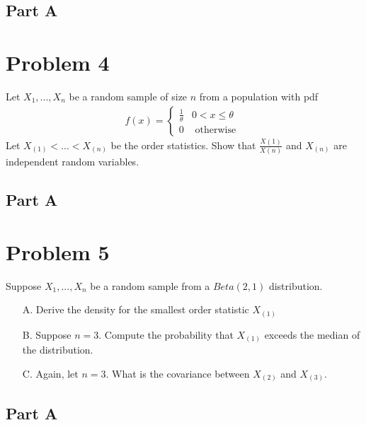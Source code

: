 \documentclass{article}
\begin{document}
\subsection*{Part A}
   
\clearpage
\section*{Problem 4}
 Let $X_1,...,X_n$ be a random sample of size $n$ from a population with pdf
 \begin{align*}
 f(x) = \begin{cases} 
      \frac{1}{\theta} & 0<x\leq \theta \\
       0 & \text{ otherwise } 
   \end{cases}
\end{align*}
Let $X_{(1)}<...< X_{(n)}$ be the order statistics. Show that $\frac{X(1)}{X(n)}$ and $X_{(n)}$ are independent
random variables.

\subsection*{Part A}



\clearpage
\section*{Problem 5}
Suppose $X_1,...,X_n$ be a random sample from a $Beta(2,1)$ distribution.
\begin{enumerate}
\item[A.] Derive the density for the smallest order statistic $X_{(1)}$
\item[B.] Suppose $n = 3$. Compute the probability that $X_{(1)}$ exceeds the median of the distribution.
\item[C.] Again, let $n = 3$. What is the covariance between $X_{(2)}$ and $X_{(3)}$.

\end{enumerate}

\subsection*{Part A}
\end{document}
